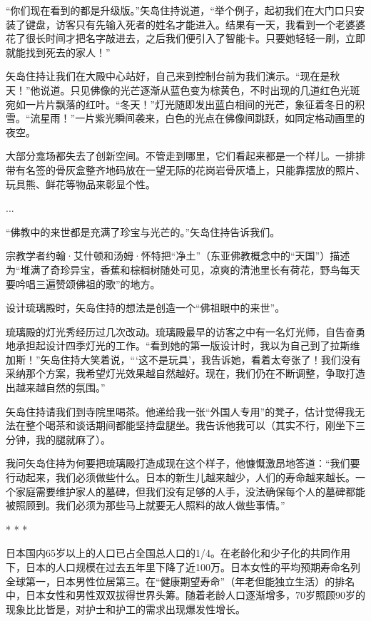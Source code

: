 \documentclass[12pt,oneside]{book}
\begin{document}
“你们现在看到的都是升级版。”矢岛住持说道，“举个例子，起初我们在大门口只安装了键盘，访客只有先输入死者的姓名才能进入。结果有一天，我看到一个老婆婆花了很长时间才把名字敲进去，之后我们便引入了智能卡。只要她轻轻一刷，立即就能找到死去的家人！”

矢岛住持让我们在大殿中心站好，自己来到控制台前为我们演示。“现在是秋天！”他说道。只见佛像的光芒逐渐从蓝色变为棕黄色，不时出现的几道红色光斑宛如一片片飘落的红叶。“冬天！”灯光随即发出蓝白相间的光芒，象征着冬日的积雪。“流星雨！”一片紫光瞬间袭来，白色的光点在佛像间跳跃，如同定格动画里的夜空。

大部分龛场都失去了创新空间。不管走到哪里，它们看起来都是一个样儿。一排排带有名签的骨灰盒整齐地码放在一望无际的花岗岩骨灰墙上，只能靠摆放的照片、玩具熊、鲜花等物品来彰显个性。

...

“佛教中的来世都是充满了珍宝与光芒的。”矢岛住持告诉我们。

宗教学者约翰·艾什顿和汤姆·怀特把“净土”（东亚佛教概念中的“天国”）描述为“堆满了奇珍异宝，香蕉和棕榈树随处可见，凉爽的清池里长有荷花，野鸟每天要吟唱三遍赞颂佛祖的歌”的地方。

设计琉璃殿时，矢岛住持的想法是创造一个“佛祖眼中的来世”。

琉璃殿的灯光秀经历过几次改动。琉璃殿最早的访客之中有一名灯光师，自告奋勇地承担起设计四季灯光的工作。“看到她的第一版设计时，我以为自己到了拉斯维加斯！”矢岛住持大笑着说，“‘这不是玩具’，我告诉她，看着太夸张了！我们没有采纳那个方案，我希望灯光效果越自然越好。现在，我们仍在不断调整，争取打造出越来越自然的氛围。”

矢岛住持请我们到寺院里喝茶。他递给我一张“外国人专用”的凳子，估计觉得我无法在整个喝茶和谈话期间都能坚持盘腿坐。我告诉他我可以（其实不行，刚坐下三分钟，我的腿就麻了）。

我问矢岛住持为何要把琉璃殿打造成现在这个样子，他慷慨激昂地答道：“我们要行动起来，我们必须做些什么。日本的新生儿越来越少，人们的寿命越来越长。一个家庭需要维护家人的墓碑，但我们没有足够的人手，没法确保每个人的墓碑都能被照顾到。我们必须为那些马上就要无人照料的故人做些事情。”

\begin{center}
* * *
\end{center}
日本国内65岁以上的人口已占全国总人口的1/4。在老龄化和少子化的共同作用下，日本的人口规模在过去五年里下降了近100万。日本女性的平均预期寿命名列全球第一，日本男性位居第三。在“健康期望寿命”（年老但能独立生活）的排名中，日本女性和男性双双拔得世界头筹。随着老龄人口逐渐增多，70岁照顾90岁的现象比比皆是，对护士和护工的需求出现爆发性增长。
\end{document}

